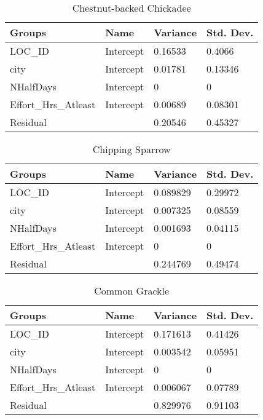 \begin{longtable}[c]{|l|l|l|l|}
\caption{Chestnut-backed Chickadee}
\label{my-label}\\
\hline
Groups               & Name      & Variance & Std. Dev. \\ \hline
\endhead
%
LOC\_ID              & Intercept & 0.16533  & 0.4066    \\ \hline
city                 & Intercept & 0.01781  & 0.13346   \\ \hline
NHalfDays            & Intercept & 0        & 0         \\ \hline
Effort\_Hrs\_Atleast & Intercept & 0.00689  & 0.08301   \\ \hline
Residual             &           & 0.20546  & 0.45327   \\ \hline
\end{longtable}

\begin{longtable}[c]{|l|l|l|l|}
\caption{Chipping Sparrow}
\label{my-label}\\
\hline
Groups               & Name      & Variance & Std. Dev. \\ \hline
\endhead
%
LOC\_ID              & Intercept & 0.089829 & 0.29972   \\ \hline
city                 & Intercept & 0.007325 & 0.08559   \\ \hline
NHalfDays            & Intercept & 0.001693 & 0.04115   \\ \hline
Effort\_Hrs\_Atleast & Intercept & 0        & 0         \\ \hline
Residual             &           & 0.244769 & 0.49474   \\ \hline
\end{longtable}

\begin{longtable}[c]{|l|l|l|l|}
\caption{Common Grackle}
\label{my-label}\\
\hline
Groups               & Name      & Variance & Std. Dev. \\ \hline
\endhead
%
LOC\_ID              & Intercept & 0.171613 & 0.41426   \\ \hline
city                 & Intercept & 0.003542 & 0.05951   \\ \hline
NHalfDays            & Intercept & 0        & 0         \\ \hline
Effort\_Hrs\_Atleast & Intercept & 0.006067 & 0.07789   \\ \hline
Residual             &           & 0.829976 & 0.91103   \\ \hline
\end{longtable}


